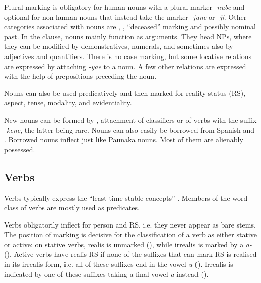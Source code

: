 Plural marking is obligatory for human nouns with a plural marker \textit{-nube} and optional for non-human nouns that instead take the  marker \textit{-jane} or  \textit{-ji}. 
Other categories associated with nouns are , , “deceased” marking and possibly nominal past. In the clause, nouns mainly function as arguments. They head NPs, where they can be modified by demonstratives, numerals, and sometimes also by adjectives and quantifiers. There is no case marking, but some locative relations are expressed by attaching \textit{-yae} to a noun. A few other  relations are expressed with the help of prepositions preceding the noun. 

Nouns can also be used predicatively and then marked for reality status (RS), aspect, tense, modality, and evidentiality.

New nouns can be formed by , attachment of classifiers or  of verbs with the suffix \textit{-kene}, the latter being rare. Nouns can also easily be borrowed from Spanish and . Borrowed nouns inflect just like Paunaka nouns. Most of them are alienably possessed.

\subsection{Verbs}\label{sec:POS_Verbs}

Verbs typically express the “least time-stable concepts” \citep[47]{Payne1997}. Members of the word class of verbs are mostly used as predicates.

Verbs obligatorily inflect for person and RS, i.e. they never appear as bare stems. The position of  marking is decisive for the classification of a verb as either stative or active: on stative verbs, realis is unmarked (), while irrealis is marked by a  \textit{a-} (). Active verbs have realis RS if none of the suffixes that can mark RS is realised in its irrealis form, i.e. all of these suffixes end in the vowel \textit{u} (). Irrealis is indicated by one of these suffixes taking a final vowel \textit{a} instead (). 

